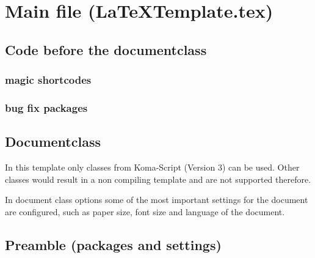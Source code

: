 \chapter{Main file (LaTeXTemplate.tex)}
\label{chap:doc:MainFile}

\section{Code before the documentclass}
\label{sec:main:prefix}

\subsection{magic shortcodes}

\subsection{bug fix packages}

\section{Documentclass}
\label{sec:main:class}
In this template only classes from Koma-Script (Version 3) can be used.
Other classes would result in a non compiling template and are not supported therefore. 

In document class options some of the most important settings for the document are configured, such as paper size, font size and language of the document.

\section{Preamble (packages and settings)}
\label{sec:doc:preamble}


